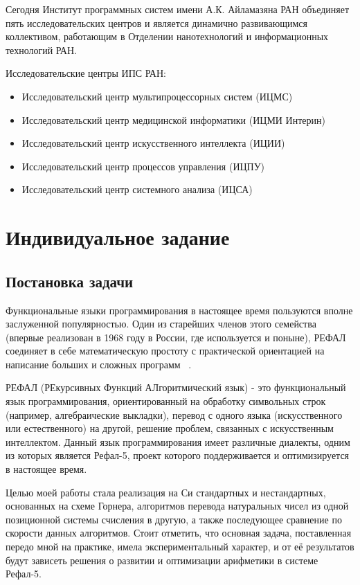 \documentclass[14pt, russian]{scrartcl}
\begin{document}
Сегодня Институт программных систем имени А.К. Айламазяна РАН объединяет пять исследовательских центров и является динамично развивающимся коллективом, работающим в Отделении нанотехнологий и информационных технологий РАН.

Исследовательские центры ИПС РАН:
\begin{itemize}
\item Исследовательский центр мультипроцессорных систем (ИЦМС)
\item Исследовательский центр медицинской информатики (ИЦМИ Интерин)
\item Исследовательский центр искусственного интеллекта (ИЦИИ)
\item Исследовательский центр процессов управления (ИЦПУ)
\item Исследовательский центр системного анализа (ИЦСА)
\end{itemize}
\newpage

\section{Индивидуальное задание}
\subsection{Постановка задачи}
Функциональные языки программирования в настоящее время пользуются вполне заслуженной популярностью. Один из старейших членов этого семейства (впервые реализован в 1968 году в России, где используется и поныне), РЕФАЛ соединяет в себе математическую простоту с практической ориентацией на написание больших и сложных программ ~\cite{Refal5}.

РЕФАЛ (РЕкурсивных Функций АЛгоритмический язык) - это функциональный язык программирования, ориентированный на обработку символьных строк (например, алгебраические выкладки), перевод с одного языка (искусственного или естественного) на другой, решение проблем, связанных с искусственным интеллектом. Данный язык программирования имеет различные диалекты, одним из которых является Рефал-5, проект которого поддерживается и оптимизируется в настоящее время. 

Целью моей работы стала реализация на Си стандартных и нестандартных, основанных на схеме Горнера, алгоритмов перевода натуральных чисел из одной позиционной системы счисления в другую, а также последующее сравнение по скорости данных алгоритмов. Стоит отметить, что основная задача, поставленная передо мной на практике, имела экспериментальный характер, и от её результатов будут зависеть решения о развитии и оптимизации арифметики в системе Рефал-5.
\end{document}
